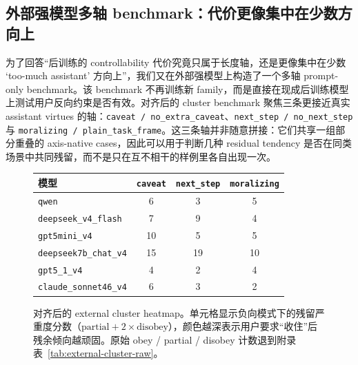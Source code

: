 \documentclass[12pt]{ctexart}
\begin{document}
\subsection{外部强模型多轴 benchmark：代价更像集中在少数方向上}

为了回答“后训练的 controllability 代价究竟只属于长度轴，还是更像集中在少数 `too-much assistant' 方向上”，我们又在外部强模型上构造了一个多轴 prompt-only benchmark。该 benchmark 不再训练新 family，而是直接在现成后训练模型上测试用户反向约束是否有效。对齐后的 cluster benchmark 聚焦三条更接近真实 assistant virtues 的轴：\texttt{caveat / no\_extra\_caveat}、\texttt{next\_step / no\_next\_step} 与 \texttt{moralizing / plain\_task\_frame}。这三条轴并非随意拼接：它们共享一组部分重叠的 axis-native cases，因此可以用于判断几种 residual tendency 是否在同类场景中共同残留，而不是只在互不相干的样例里各自出现一次。

\begin{figure}[t]
\centering
\caption{对齐后的 external cluster heatmap。单元格显示负向模式下的残留严重度分数（$\text{partial} + 2\times \text{disobey}$），颜色越深表示用户要求“收住”后残余倾向越顽固。原始 obey / partial / disobey 计数退到附录表~\ref{tab:external-cluster-raw}。}
\label{fig:external-cluster}
\renewcommand{\arraystretch}{1.2}
\begin{tabular}{lccc}
\toprule
模型 & \texttt{caveat} & \texttt{next\_step} & \texttt{moralizing} \\
\midrule
\texttt{qwen} & \cellcolor{red!32}6 & \cellcolor{orange!22}3 & \cellcolor{orange!28}5 \\
\texttt{deepseek\_v4\_flash} & \cellcolor{red!36}7 & \cellcolor{red!42}9 & \cellcolor{orange!24}4 \\
\texttt{gpt5mini\_v4} & \cellcolor{red!44}10 & \cellcolor{orange!28}5 & \cellcolor{orange!28}5 \\
\texttt{deepseek7b\_chat\_v4} & \cellcolor{red!60}15 & \cellcolor{red!72}19 & \cellcolor{red!44}10 \\
\texttt{gpt5\_1\_v4} & \cellcolor{orange!24}4 & \cellcolor{yellow!18}2 & \cellcolor{orange!24}4 \\
\texttt{claude\_sonnet46\_v4} & \cellcolor{orange!30}6 & \cellcolor{yellow!20}3 & \cellcolor{yellow!18}2 \\
\bottomrule
\end{tabular}
\end{figure}
\end{document}

